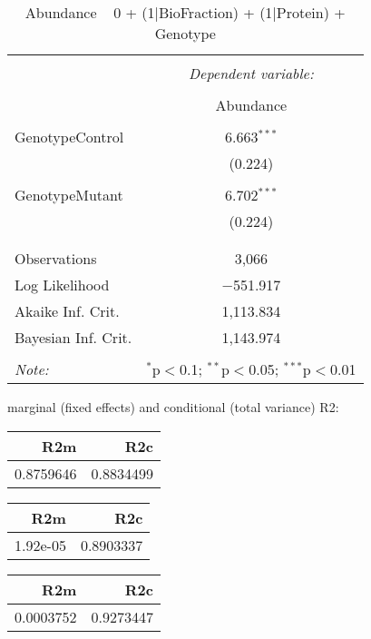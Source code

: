 \documentclass[11pt]{report}
\begin{document}
\begin{table}[!htbp] \centering 
  \caption{Abundance ~ 0 + (1|BioFraction) + (1|Protein) + Genotype} 
  \label{} 
\begin{tabular}{@{\extracolsep{5pt}}lc} 
\\[-1.8ex]\hline 
\hline \\[-1.8ex] 
 & \multicolumn{1}{c}{\textit{Dependent variable:}} \\ 
\cline{2-2} 
\\[-1.8ex] & Abundance \\ 
\hline \\[-1.8ex] 
 GenotypeControl & 6.663$^{***}$ \\ 
  & (0.224) \\ 
  & \\ 
 GenotypeMutant & 6.702$^{***}$ \\ 
  & (0.224) \\ 
  & \\ 
\hline \\[-1.8ex] 
Observations & 3,066 \\ 
Log Likelihood & $-$551.917 \\ 
Akaike Inf. Crit. & 1,113.834 \\ 
Bayesian Inf. Crit. & 1,143.974 \\ 
\hline 
\hline \\[-1.8ex] 
\textit{Note:}  & \multicolumn{1}{r}{$^{*}$p$<$0.1; $^{**}$p$<$0.05; $^{***}$p$<$0.01} \\ 
\end{tabular} 
\end{table} 
marginal (fixed effects) and conditional (total variance) R2:

\begin{tabular}{r|r}
\hline
R2m & R2c\\
\hline
0.8759646 & 0.8834499\\
\hline
\end{tabular}

\begin{tabular}{r|r}
\hline
R2m & R2c\\
\hline
1.92e-05 & 0.8903337\\
\hline
\end{tabular}

\begin{tabular}{r|r}
\hline
R2m & R2c\\
\hline
0.0003752 & 0.9273447\\
\hline
\end{tabular}
\end{document}
